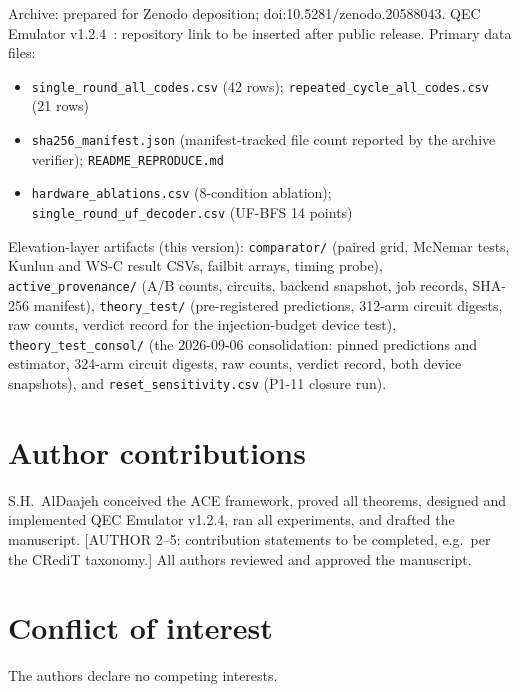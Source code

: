 \documentclass[11pt,a4paper]{article}
\begin{document}
Archive: prepared for Zenodo deposition; doi:10.5281/zenodo.20588043.
QEC Emulator v1.2.4~\cite{AlDaajeh2026emulator}: repository link
to be inserted after public release.
Primary data files:
\begin{itemize}[leftmargin=1.4em,itemsep=0pt,topsep=2pt]
  \item \texttt{single\_round\_all\_codes.csv} (42 rows);
        \texttt{repeated\_cycle\_all\_codes.csv} (21 rows)
  \item \texttt{sha256\_manifest.json} (manifest-tracked file count
        reported by the archive verifier); \texttt{README\_REPRODUCE.md}
  \item \texttt{hardware\_ablations.csv} (8-condition ablation);
        \texttt{single\_round\_uf\_decoder.csv} (UF-BFS 14 points)
\end{itemize}
Elevation-layer artifacts (this version):
\texttt{comparator/} (paired grid, McNemar tests, Kunlun and WS-C
result CSVs, failbit arrays, timing probe),
\texttt{active\_provenance/} (A/B counts, circuits, backend snapshot,
job records, SHA-256 manifest),
\texttt{theory\_test/} (pre-registered predictions, 312-arm circuit
digests, raw counts, verdict record for the injection-budget device
test), \texttt{theory\_test\_consol/} (the 2026-09-06 consolidation:
pinned predictions and estimator, 324-arm circuit digests, raw counts,
verdict record, both device snapshots), and
\texttt{reset\_sensitivity.csv} (P1-11 closure run).

\section*{Author contributions}
S.H.\ AlDaajeh conceived the ACE framework, proved all theorems, designed
and implemented QEC Emulator v1.2.4, ran all experiments, and drafted the
manuscript. [AUTHOR 2--5: contribution statements to be completed, e.g.\
per the CRediT taxonomy.] All authors reviewed and approved the
manuscript.

\section*{Conflict of interest} The authors declare no competing interests.

\end{document}
